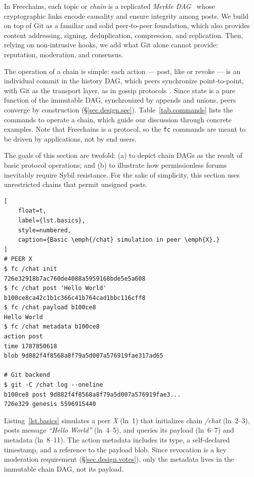 \documentclass[10pt,twocolumn]{article}
\newcommand{\FC}       {Freechains\xspace}
\newcommand{\code}[1]  {\texttt{\small{#1}}}
\begin{document}
In \FC, each topic or \emph{chain} is a replicated
\emph{Merkle DAG}~\cite{p2p.ipfs} whose cryptographic links encode causality
and ensure integrity among posts.
%
We build on top of Git as a familiar and solid peer-to-peer foundation, which
also provides content addressing, signing, deduplication, compression, and
replication.
%
Then, relying on non-intrusive hooks, we add what Git alone cannot provide:
reputation, moderation, and consensus.

The operation of a chain is simple: each action --- post, like or revoke --- is
an individual commit in the history DAG, which peers synchronize point-to-point,
with Git as the transport layer, as in gossip protocols~\cite{p2p.survey}.
%
Since state is a pure function of the immutable DAG, synchronized by appends
and unions, peers converge by construction (\S\ref{sec.design.sec}).
%
Table~\ref{tab.commands} lists the commands to operate a chain, which guide our
discussion through concrete examples.
%
Note that \FC is a protocol, so the \code{fc} commands are meant to be driven
by applications, not by end users.

The goals of this section are twofold:
    (a) to depict chain DAGs as the result of basic protocol operations; and
    (b) to illustrate how permissionless forums inevitably require Sybil
        resistance.
For the sake of simplicity, this section uses unrestricted chains that permit
unsigned posts.

\begin{lstlisting}[
    float=t,
    label={lst.basics},
    style=numbered,
    caption={Basic \emph{/chat} simulation in peer \emph{X}.}
]
# PEER X
$ fc /chat init
726e32918b7ac760de4088a5959168bde5e5a608
$ fc /chat post 'Hello World'
b100ce8ca42c1b1c366c41b764cad1bbc116cff8
$ fc /chat payload b100ce8
Hello World
$ fc /chat metadata b100ce8
action post
time 1787850618
blob 9d882f4f8568a8f79a5d007a576919fae317ad65

# Git backend
$ git -C /chat log --oneline
b100ce8 post 9d882f4f8568a8f79a5d007a576919fae3...
726e329 genesis 5596915440
\end{lstlisting}

Listing~\ref{lst.basics} simulates a peer \emph{X} (ln~1) that initializes
chain \emph{/chat} (ln~2--3), posts message \emph{``Hello World''} (ln~4--5),
and queries its payload (ln~6--7) and metadata (ln~8--11).
%
The action metadata includes its type, a self-declared timestamp, and a
reference to the payload blob.
Since revocation is a key moderation requirement (\S\ref{sec.design.votes}),
only the metadata lives in the immutable chain DAG, not its payload.
\end{document}
